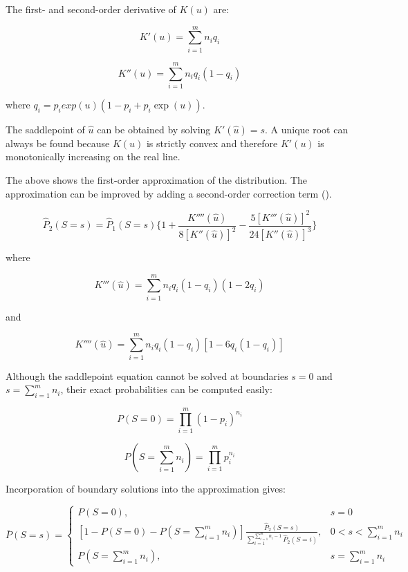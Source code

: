 The first- and second-order derivative of $K(u)$ are:

\begin{equation}
K'(u) = \sum_{i=1}^m n_i q_i
\end{equation}

\begin{equation}
K''(u) = \sum_{i=1}^m n_i q_i (1-q_i)
\end{equation}

where $q_i = p_i exp(u) (1-p_i + p_i \exp(u))$. 

The saddlepoint of $\hat{u}$ can be obtained by solving $K'(\hat{u})=s$. A unique root can always be found because $K(u)$ is strictly convex and therefore $K'(u)$ is monotonically increasing on the real line. 

The above shows the first-order approximation of the distribution. The approximation can be improved by adding a second-order correction term (\cite{Anonymous:0hq1uBaf}). 

\begin{equation}
\hat{P}_2(S=s)=\hat{P}_1(S=s)\Big\{1 + \frac{K''''(\hat{u})}{8[K''(\hat{u})]^2} - \frac{5[K'''(\hat{u})]^2}{24[K''(\hat{u})]^3}\Big\}
\end{equation}

where 

$$K'''(\hat{u}) = \sum_{i=1}^m n_i q_i (1-q_i) (1-2q_i)$$

and 

$$K''''(\hat{u}) = \sum_{i=1}^m n_i q_i (1-q_i) [1-6q_i(1-q_i)]$$

Although the saddlepoint equation cannot be solved at boundaries $s = 0$ and $s=\sum_{i=1}^m n_i$, their exact probabilities can be computed easily: 

\begin{equation}
P(S=0) = \prod_{i=1}^m (1-p_i)^{n_i}
\end{equation}

\begin{equation}
P(S=\sum_{i=1}^m n_i)=\prod_{i=1}^m p_i^{n_i}
\end{equation}

Incorporation of boundary solutions into the approximation gives: 

\begin{equation}
\bar{P}(S=s)=
\begin{cases}
P(S=0), & s=0 \\
[1-P(S=0)-P(S=\sum_{i=1}^m n_i)] \frac{\hat{P}_2(S=s)}{\sum_{i=1}^{\sum_{i=1}^m n_i-1} \hat{P}_2(S=i)}, & 0 < s < \sum_{i=1}^m n_i \\
P(S=\sum_{i=1}^m n_i), & s=\sum_{i=1}^m n_i 
\end{cases}
\label{eq:10}
\end{equation}


